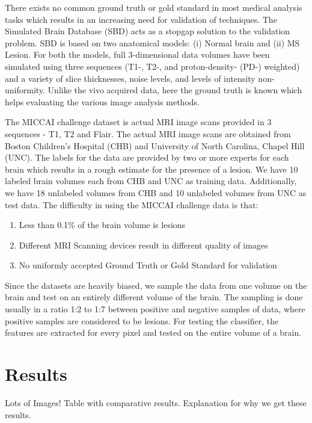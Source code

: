 \documentclass{article} %
\begin{document}
There exists no common ground truth or gold standard in most medical analysis tasks which results in an increasing need for validation of techniques. The Simulated Brain Database (SBD) acts as a stopgap solution to the validation problem. SBD is based on two anatomical models: (i) Normal brain and (ii) MS Lesion.  For both the models, full 3-dimensional data volumes have been simulated using three sequences (T1-, T2-, and proton-density- (PD-) weighted) and a variety of slice thicknesses, noise levels, and levels of intensity non-uniformity.  Unlike the vivo acquired data, here the ground truth is known which helps evaluating the various image analysis methods. 

The MICCAI challenge dataset is actual MRI image scans provided in 3 sequences - T1, T2 and Flair. The actual MRI image scans are obtained from Boston Children's Hospital (CHB) and University of North Carolina, Chapel Hill (UNC). The labels for the data are provided by two or more experts for each brain which results in a rough estimate for the presence of a lesion. We have 10 labeled brain volumes each from CHB and UNC as training data. Additionally, we have 18 unlabeled volumes from CHB and 10 unlabeled volumes from UNC as test data. The difficulty in using the MICCAI challenge data is that:
\begin{enumerate}
\item Less than 0.1\% of the brain volume is lesions
\item Different MRI Scanning devices result in different quality of images
\item No uniformly accepted Ground Truth or Gold Standard for validation
\end{enumerate}

Since the datasets are heavily biased, we sample the data from one volume on the brain and test on an entirely different volume of the brain. The sampling is done usually in a ratio 1:2 to 1:7 between positive and negative samples of data, where positive samples are considered to be lesions. For testing the classifier, the features are extracted for every pixel and tested on the entire volume of a brain.  

\section{Results}
Lots of Images! Table with comparative results. Explanation for why we get these results. 
\end{document}
